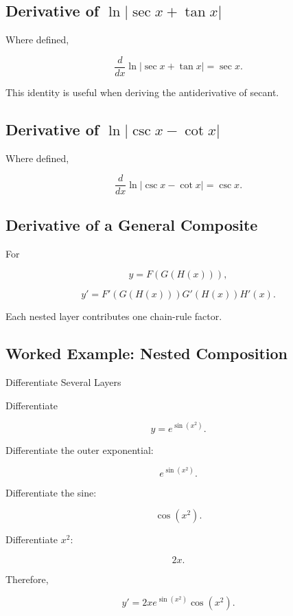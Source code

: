 \subsection{Derivative of \(\ln|\sec x+\tan x|\)}
\label{subsec:log-sec-tan-derivative}

Where defined,

\[
\boxed{
\frac{d}{dx}
\ln|\sec x+\tan x|
=
\sec x.
}
\]

This identity is useful when deriving the antiderivative of secant.

\subsection{Derivative of \(\ln|\csc x-\cot x|\)}
\label{subsec:log-csc-cot-derivative}

Where defined,

\[
\boxed{
\frac{d}{dx}
\ln|\csc x-\cot x|
=
\csc x.
}
\]

\subsection{Derivative of a General Composite}
\label{subsec:general-composite-derivative}

For

\[
y
=
F(G(H(x))),
\]

\[
\boxed{
y'
=
F'(G(H(x)))
G'(H(x))
H'(x).
}
\]

Each nested layer contributes one chain-rule factor.

\subsection{Worked Example: Nested Composition}
\label{subsec:worked-nested-composition}

\begin{workedexamplebox}{Differentiate Several Layers}

Differentiate

\[
y
=
e^{\sin(x^2)}.
\]

Differentiate the outer exponential:

\[
e^{\sin(x^2)}.
\]

Differentiate the sine:

\[
\cos(x^2).
\]

Differentiate \(x^2\):

\[
2x.
\]

Therefore,

\begin{answerbox}
\[
\boxed{
y'
=
2x
e^{\sin(x^2)}
\cos(x^2).
}
\]
\end{answerbox}

\end{workedexamplebox}

